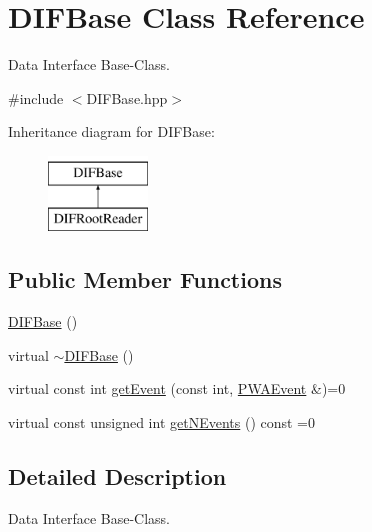 \hypertarget{classDIFBase}{
\section{DIFBase Class Reference}
\label{d9/db5/classDIFBase}
}


Data Interface Base-\/Class.  




{\ttfamily \#include $<$DIFBase.hpp$>$}

Inheritance diagram for DIFBase:\begin{figure}[H]
\begin{center}
\leavevmode
\includegraphics[height=2.000000cm]{d9/db5/classDIFBase}
\end{center}
\end{figure}
\subsection*{Public Member Functions}
\begin{DoxyCompactItemize}
\item 
\hyperlink{classDIFBase_acbbc1c92aa68251a8bc21a49d3c23374}{DIFBase} ()
\item 
virtual \hyperlink{classDIFBase_a36a102f92fd77b49a88274b88d150905}{$\sim$DIFBase} ()
\item 
virtual const int \hyperlink{classDIFBase_ab31cfae817f0420fa6a7b8b2cc013baa}{getEvent} (const int, \hyperlink{classPWAEvent}{PWAEvent} \&)=0
\item 
virtual const unsigned int \hyperlink{classDIFBase_a69e359ba0221a1b7bb32cdcbb819d56a}{getNEvents} () const =0
\end{DoxyCompactItemize}


\subsection{Detailed Description}
Data Interface Base-\/Class. 

